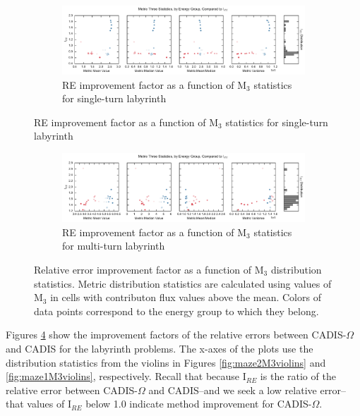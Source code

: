 \begin{figure}[htb!]
  \centering
  \begin{subfigure}[t]{\textwidth}
    \includegraphics[width=\linewidth]{./chapters/characterization_probs/figures/char/maze2/metric_three_err_stats_mean.pdf}
    \caption{RE improvement factor as a function of M$_{3}$ statistics for single-turn labyrinth}
    \label{fig:maze2M3errs}
  \end{subfigure}
\end{figure}
\begin{figure}[htb!]\ContinuedFloat
  \centering
  \begin{subfigure}[t]{\textwidth}
    \includegraphics[width=\linewidth]{./chapters/characterization_probs/figures/char/maze1/metric_three_err_stats_mean.pdf}
    \caption{RE improvement factor as a function of M$_3$ statistics for multi-turn labyrinth}
    \label{fig:maze1M3errs}
  \end{subfigure}
  \caption[Relative error improvement factor as a function of M$_3$
  distribution statistics.]
  {Relative error improvement factor as a function of M$_3$
  distribution statistics. Metric distribution statistics are calculated using
  values of M$_3$ in cells with contributon flux values above the mean. Colors
  of data points correspond to the energy group to which they belong.}
  \label{fig:labyrinthIREs}
\end{figure}

Figures \ref{fig:labyrinthIREs} show the improvement factors of the relative
errors between CADIS-$\Omega$ and CADIS for the labyrinth problems. The x-axes
of the plots use the
distribution statistics from the violins in Figures \ref{fig:maze2M3violins} and
\ref{fig:maze1M3violins}, respectively. Recall that because I$_{RE}$ is the
ratio of the relative error between CADIS-$\Omega$ and CADIS--and we seek a low
relative error--that values of I$_{RE}$ below 1.0 indicate method improvement
for CADIS-$\Omega$.

